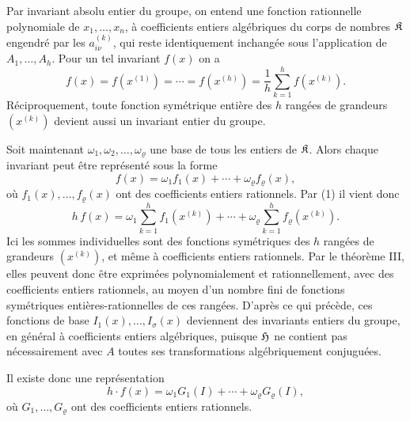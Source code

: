 Par invariant absolu entier du groupe, on entend une fonction rationnelle polynomiale de $x_1,\ldots,x_n$, à coefficients entiers algébriques du corps de nombres $\mathfrak K$ engendré par les $a_{i\nu}^{(k)}$, qui reste identiquement inchangée sous l'application de $A_1,\ldots,A_h$. Pour un tel invariant $f(x)$ on a
\begin{equation}
        f(x)=f(x^{(1)})=\cdots=f(x^{(h)})
        =\frac1h\sum_{k=1}^{h}f(x^{(k)}).
\end{equation}
Réciproquement, toute fonction symétrique entière des $h$ rangées de grandeurs $(x^{(k)})$ devient aussi un invariant entier du groupe.

Soit maintenant $\omega_1,\omega_2,\ldots,\omega_\varrho$ une base de tous les entiers de $\mathfrak K$. Alors chaque invariant peut être représenté sous la forme
\[
        f(x)=\omega_1 f_1(x)+\cdots+\omega_\varrho f_\varrho(x),
\]
où $f_1(x),\ldots,f_\varrho(x)$ ont des coefficients entiers rationnels. Par (1) il vient donc
\[
        h\,f(x)
        =
        \omega_1\sum_{k=1}^{h}f_1(x^{(k)})
        +\cdots+
        \omega_\varrho\sum_{k=1}^{h}f_\varrho(x^{(k)}).
\]
Ici les sommes individuelles sont des fonctions symétriques des $h$ rangées de grandeurs $(x^{(k)})$, et même à coefficients entiers rationnels. Par le théorème III, elles peuvent donc être exprimées polynomialement et rationnellement, avec des coefficients entiers rationnels, au moyen d'un nombre fini de fonctions symétriques entières-rationnelles de ces rangées. D'après ce qui précède, ces fonctions de base $I_1(x),\ldots,I_\sigma(x)$ deviennent des invariants entiers du groupe, en général à coefficients entiers algébriques, puisque $\mathfrak H$ ne contient pas nécessairement avec $A$ toutes ses transformations algébriquement conjuguées.

Il existe donc une représentation
\begin{equation}
        h\cdot f(x)=\omega_1G_1(I)+\cdots+\omega_\varrho G_\varrho(I),
\end{equation}
où $G_1,\ldots,G_\varrho$ ont des coefficients entiers rationnels.

